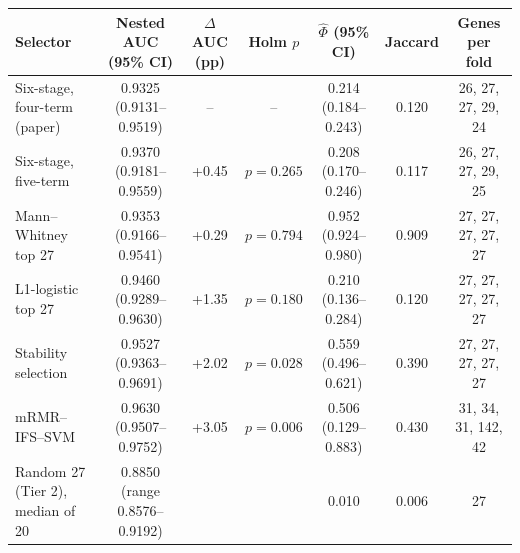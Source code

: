 \begin{tabular}{lcccccc}
\toprule
Selector & Nested AUC (95\% CI) & $\Delta$AUC (pp) & Holm $p$ & $\hat\Phi$ (95\% CI) & Jaccard & Genes per fold \\
\midrule
Six-stage, four-term (paper) & 0.9325 (0.9131--0.9519) & -- & -- & 0.214 (0.184--0.243) & 0.120 & 26, 27, 27, 29, 24 \\
Six-stage, five-term & 0.9370 (0.9181--0.9559) & +0.45 & $p = 0.265$ & 0.208 (0.170--0.246) & 0.117 & 26, 27, 27, 29, 25 \\
Mann--Whitney top 27 & 0.9353 (0.9166--0.9541) & +0.29 & $p = 0.794$ & 0.952 (0.924--0.980) & 0.909 & 27, 27, 27, 27, 27 \\
L1-logistic top 27 & 0.9460 (0.9289--0.9630) & +1.35 & $p = 0.180$ & 0.210 (0.136--0.284) & 0.120 & 27, 27, 27, 27, 27 \\
Stability selection & 0.9527 (0.9363--0.9691) & +2.02 & $p = 0.028$ & 0.559 (0.496--0.621) & 0.390 & 27, 27, 27, 27, 27 \\
mRMR--IFS--SVM & 0.9630 (0.9507--0.9752) & +3.05 & $p = 0.006$ & 0.506 (0.129--0.883) & 0.430 & 31, 34, 31, 142, 42 \\
Random 27 (Tier 2), median of 20 & 0.8850 (range 0.8576--0.9192) & & & 0.010 & 0.006 & 27 \\
\bottomrule
\end{tabular}
